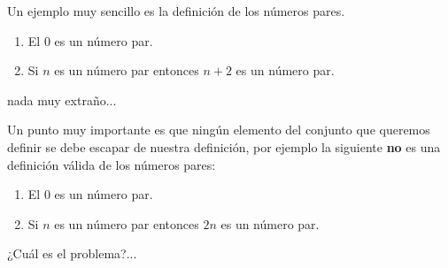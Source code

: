 \begin{ejemplo}
Un ejemplo muy sencillo es la definición de los números pares.
\begin{enumerate}
\itemsep 0pt
\item El $0$ es un número par.
\item Si $n$ es un número par entonces $n+2$ es un número par.
\end{enumerate}
nada muy extraño...
\end{ejemplo}

Un punto muy importante es que ningún elemento del conjunto que queremos definir se debe escapar de nuestra definición, por ejemplo la siguiente {\bf no} es una definición válida de los números pares:
\begin{enumerate}
\itemsep 0pt
\item El $0$ es un número par.
\item Si $n$ es un número par entonces $2n$ es un número par.
\end{enumerate}
¿Cuál es el problema?...

